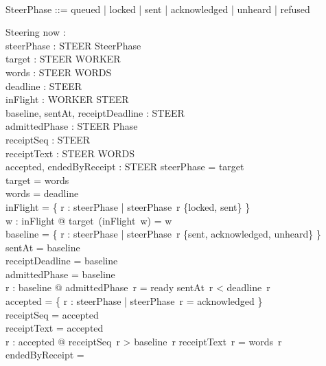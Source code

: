 \documentclass[a4paper,10pt,fleqn]{article}
\begin{document}
\begin{zed}
   \\
  SteerPhase ::= queued | locked | sent | acknowledged | unheard | refused
\end{zed}

\begin{schema}{Steering}
  now : \nat \\
  steerPhase : STEER \pfun SteerPhase \\
  target : STEER \pfun WORKER \\
  words : STEER \pfun WORDS \\
  deadline : STEER \pfun \nat \\
  inFlight : WORKER \pinj STEER \\
  baseline, sentAt, receiptDeadline : STEER \pfun \nat \\
  admittedPhase : STEER \pfun Phase \\
  receiptSeq : STEER \pfun \nat \\
  receiptText : STEER \pfun WORDS \\
  accepted, endedByReceipt : \power STEER
\where
  \dom steerPhase = \dom target \\
  \dom target = \dom words \\
  \dom words = \dom deadline \\
  \ran inFlight = \{ r : \dom steerPhase | steerPhase~r \in \{locked, sent\} \} \\
  \forall w : \dom inFlight @ target~(inFlight~w) = w \\
  \dom baseline = \{ r : \dom steerPhase | steerPhase~r \in \{sent, acknowledged, unheard\} \} \\
  \dom sentAt = \dom baseline \\
  \dom receiptDeadline = \dom baseline \\
  \dom admittedPhase = \dom baseline \\
  \forall r : \dom baseline @ admittedPhase~r = ready \land sentAt~r < deadline~r \\
  accepted = \{ r : \dom steerPhase | steerPhase~r = acknowledged \} \\
  \dom receiptSeq = accepted \\
  \dom receiptText = accepted \\
  \forall r : accepted @ receiptSeq~r > baseline~r \land receiptText~r = words~r \\
  endedByReceipt = \emptyset
\end{schema}
\end{document}
